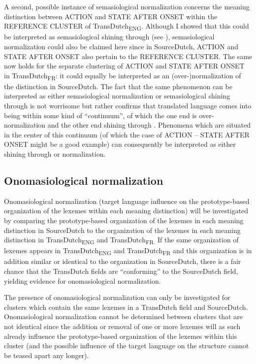 A second, possible instance of semasiological normalization concerns the meaning distinction between ACTION and STATE AFTER ONSET within the REFERENCE CLUSTER of TransDutch\textsubscript{ENG}. Although I showed that this could be interpreted as semasiological shining through (see ), semasiological normalization could also be claimed here since in SourceDutch, ACTION and STATE AFTER ONSET also pertain to the REFERENCE CLUSTER. The same now holds for the separate clustering of ACTION and STATE AFTER ONSET in TransDutch\textsubscript{FR}: it could equally be interpreted as an (over-)normalization of the distinction in SourceDutch. The fact that the same phenomenon can be interpreted as either semasiological normalization or semasiological shining through is not worrisome but rather confirms that translated language comes into being within some kind of ``continuum'', of which the one end is over-normalization and the other end shining through \citep[272]{hansen-schirra_towards_2012}. Phenomena which are situated in the center of this continuum (of which the case of ACTION – STATE AFTER ONSET might be a good example) can consequently be interpreted as either shining through or normalization.

\subsection{Onomasiological normalization}
\label{sec:4.7.2}  
Onomasiological normalization (target language influence on the prototype-based organization of the lexemes within each meaning distinction) will be investigated by comparing the prototype-based organization of the lexemes in each meaning distinction in SourceDutch to the organization of the lexemes in each meaning distinction in TransDutch\textsubscript{ENG} and TransDutch\textsubscript{FR.} If the same organization of lexemes appears in TransDutch\textsubscript{ENG} and TransDutch\textsubscript{FR} and this organization is in addition similar or identical to the organization in SourceDutch, there is a fair chance that the TransDutch fields are ``conforming'' to the SourceDutch field, yielding evidence for onomasiological normalization.

The presence of onomasiological normalization can only be investigated for clusters which contain the same lexemes in a TransDutch field and SourceDutch. Onomasiological normalization cannot be determined between clusters that are not identical since the addition or removal of one or more lexemes will as such already influence the prototype-based organization of the lexemes within this cluster (and the possible influence of the target language on the structure cannot be teased apart any longer).

